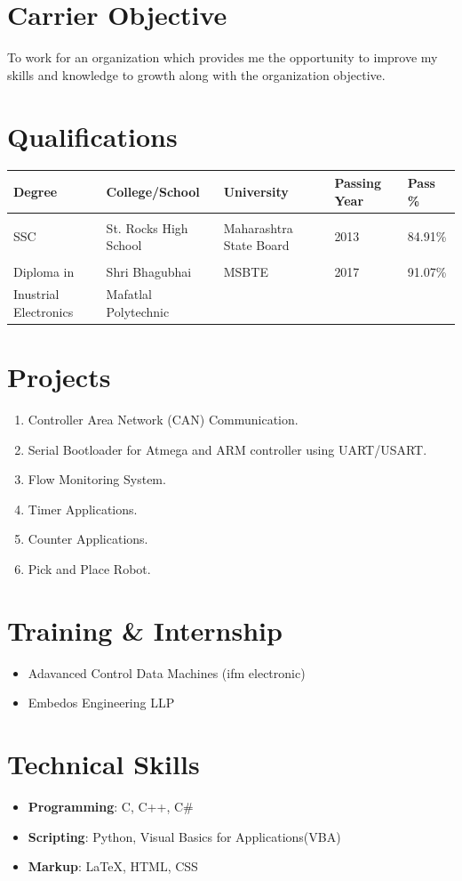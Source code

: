 \documentclass{article}
\begin{document}
\section{Carrier Objective}
To work for an organization which provides me the opportunity to improve my skills and knowledge to growth along with the organization objective.
		
\section{Qualifications}
	\begin{center}
		\begin{tabular}{l l l l l }
			Degree & College/School & University & Passing Year & Pass \% \\ \hline \\
			SSC & St. Rocks High School & Maharashtra State Board & 2013 & 84.91\% \\ \\
			Diploma in  & Shri Bhagubhai & MSBTE & 2017 & 91.07\% \\ 
			Inustrial Electronics & Mafatlal Polytechnic
		\end{tabular}
	\end{center}

\section{Projects}
	\begin{enumerate}
		\item Controller Area Network (CAN) Communication.
		\item Serial Bootloader for Atmega and ARM controller using UART/USART.
		\item Flow Monitoring System.
		\item Timer Applications. 
		\item Counter Applications.
		\item Pick and Place Robot.
	\end{enumerate}

\section{Training \& Internship}
	\begin{itemize}
		\item Adavanced Control Data Machines (ifm electronic)
		\item Embedos Engineering LLP
	\end{itemize}

\section{Technical Skills}
	\begin{itemize}
		\item \textbf{Programming}: C, C++, C\#
		\item \textbf{Scripting}: Python, Visual Basics for Applications(VBA)
		\item \textbf{Markup}: {\LaTeX}, HTML, CSS
	\end{itemize}
\end{document}
